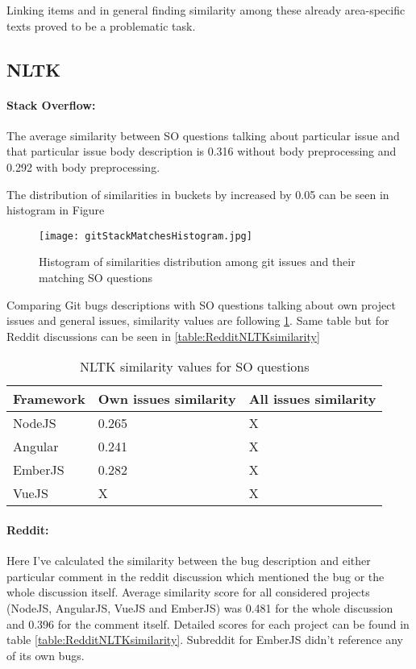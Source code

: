 Linking items and in general finding similarity among these already area-specific texts proved to be a problematic task. 

\subsection{NLTK}
\paragraph{Stack Overflow:}
The average similarity between SO questions talking about particular issue and that particular issue body description is 0.316 without body preprocessing and 0.292 with body preprocessing.

The distribution of similarities in buckets by increased by 0.05 can be seen in histogram in Figure 

\begin{figure}[H]%
    \centering
	\texttt{[image: gitStackMatchesHistogram.jpg]}
    \caption{Histogram of similarities distribution among git issues and their matching SO questions}%
    \label{fig:GitStackMatchesHistogram}%
\end{figure}



Comparing Git bugs descriptions with SO questions talking about own project issues and general issues, similarity values are following \ref{table:StackOverflowNLTKsimilarity}. Same table but for Reddit discussions can be seen in \ref{table:RedditNLTKsimilarity}

\begin{table}[H]
\centering
\begin{tabular}{ |p{3cm}||p{5cm}|p{5cm}|}
 \hline
\textbf{ Framework }& \textbf{Own issues similarity}& \textbf{All issues similarity}\\
 \hline
 NodeJS   & 0.265 & X\\ \hline
 Angular & 0.241 & X\\ \hline
 EmberJS & 0.282 & X\\ \hline 
 VueJS &   X & X\\ \hline
\end{tabular}
\caption{NLTK similarity values for SO questions}
\label{table:StackOverflowNLTKsimilarity}
\end{table}

\paragraph{Reddit:}
Here I've calculated the similarity between the bug description and either particular comment in the reddit discussion which mentioned the bug or the whole discussion itself. Average similarity score for all considered projects (NodeJS, AngularJS, VueJS and EmberJS) was 0.481 for the whole discussion and 0.396 for the comment itself. Detailed scores for each project can be found in table \ref{table:RedditNLTKsimilarity}. Subreddit for EmberJS didn't reference any of its own bugs.

